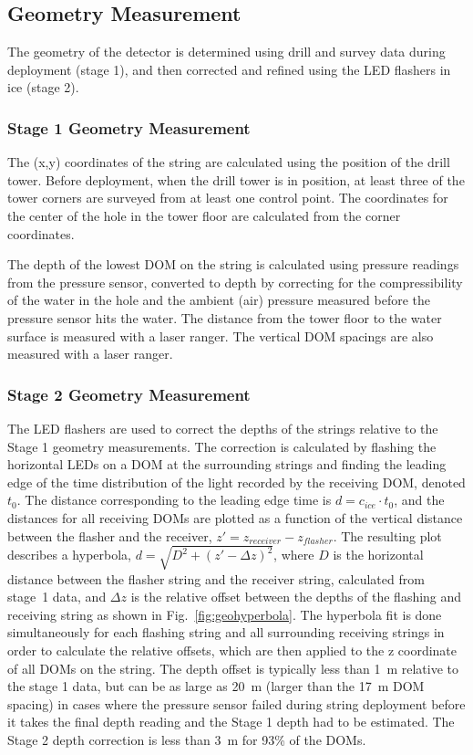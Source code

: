\subsection{Geometry Measurement}

The geometry of the detector is determined using drill and survey data
during deployment (stage 1), and then corrected and refined using the LED
flashers in ice (stage 2).
\subsubsection{Stage 1 Geometry Measurement}
The (x,y) coordinates of the string are calculated using the position
of the drill tower. Before deployment, when the drill tower is in position, at least three
of the tower corners are surveyed from at least one control point.
The coordinates for the center of the hole in the tower floor are
calculated from the corner coordinates. 

The depth of the lowest DOM on the string is calculated using pressure
readings from the pressure sensor, converted to depth by correcting
for the compressibility of the water in the hole and the ambient (air)
pressure measured before the pressure sensor hits the water. The
distance from the tower floor to the water surface is measured with a
laser ranger. The vertical DOM spacings are also measured with a laser
ranger.

\subsubsection{Stage 2 Geometry Measurement}

The LED flashers are used to correct the depths of the
strings relative to the Stage 1 geometry measurements. The correction is
calculated by flashing the horizontal LEDs on a DOM at the surrounding strings and finding the leading edge of the time distribution of the
light recorded by the
receiving DOM, denoted $t_0$. The distance corresponding to the
leading edge time is $d = c_{ice} \cdot t_0$, and the distances for
all receiving DOMs are plotted as a function of the vertical distance
between the flasher and the receiver, $z' = z_{receiver} -
z_{flasher}$. The resulting plot describes a hyperbola, $d = \sqrt{D^2
+ (z' -\Delta z)^2}$, where $D$ is the horizontal distance between the
flasher string and the receiver string, calculated from stage~1 data,
and $\Delta z$ is the relative offset between the depths of the
flashing and receiving string as shown in Fig.~\ref{fig:geohyperbola}. The hyperbola fit is done
simultaneously for each flashing string and all surrounding receiving
strings in order to calculate the relative offsets, which are then
applied to the z coordinate of all DOMs on the string. The depth offset is typically less than 1~m relative to the
stage 1 data, but can be as large as 20~m (larger than the 17~m DOM
spacing) in cases where the pressure sensor failed during string
deployment before it takes the final depth reading and the Stage 1 depth had to be estimated. The Stage 2 depth correction is less than 3~m for 93\% of the DOMs.

